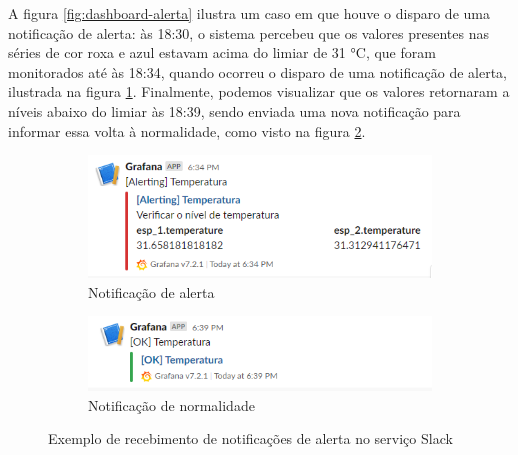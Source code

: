 \documentclass[../monografia.tex]{subfiles}
\begin{document}
A figura \ref{fig:dashboard-alerta} ilustra um caso em que houve o disparo de uma notificação de alerta: às 18:30, o sistema percebeu que os valores presentes nas séries de cor roxa e azul estavam acima do limiar de 31 °C, que foram monitorados até às 18:34, quando ocorreu o disparo de uma notificação de alerta, ilustrada na figura \ref{fig:slack-alerta}. Finalmente, podemos visualizar que os valores retornaram a níveis abaixo do limiar às 18:39, sendo enviada uma nova notificação para informar essa volta à normalidade, como visto na figura \ref{fig:slack-ok}.


\begin{figure}[h!]
	\centering
	\begin{subfigure}[b]{0.7\textwidth}
		\includegraphics[width=\textwidth]{grafana-slack-alert.png}
		\caption{Notificação de alerta}
		\label{fig:slack-alerta}
	\end{subfigure}
	
	\begin{subfigure}[b]{0.7\textwidth}
		\includegraphics[width=\textwidth]{grafana-slack-ok.png}
		\caption{Notificação de normalidade}
		\label{fig:slack-ok}
	\end{subfigure}

	\caption{Exemplo de recebimento de notificações de alerta no serviço Slack}
	\label{fig:slack-notifications}
\end{figure}
\end{document}
